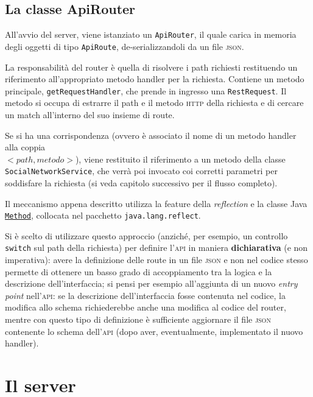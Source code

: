 \documentclass[a4paper,8pt]{article} %
\def\code#1{\texttt{#1}}
\begin{document}
\subsection{La classe ApiRouter}
All'avvio del server, viene istanziato un \code{ApiRouter}, il quale carica in memoria degli oggetti di tipo \code{ApiRoute}, de-serializzandoli da un file \textsc{json}.
\par La responsabilità del router è quella di risolvere i path richiesti restituendo un riferimento all'appropriato metodo handler per la richiesta.
Contiene un metodo principale, \code{getRequestHandler}, che prende in ingresso una \code{RestRequest}.
Il metodo si occupa di estrarre il path e il metodo \textsc{http} della richiesta e di cercare un match all'interno del suo insieme di route.
\par Se si ha una corrispondenza (ovvero è associato il nome di un metodo handler alla coppia\\ $<path, metodo>$),
viene restituito il riferimento a un metodo della classe \code{SocialNetworkService}, che verrà poi invocato coi corretti parametri per
soddisfare la richiesta (si veda capitolo successivo per il flusso completo).
\par Il meccanismo appena descritto utilizza la feature della \emph{reflection} e la classe Java \href{https://docs.oracle.com/javase/8/docs/api/java/lang/reflect/Method.html}{\code{Method}},
collocata nel pacchetto \code{java.lang.reflect}.
\par Si è scelto di utilizzare questo approccio (anziché, per esempio, un controllo \code{switch} sul path della richiesta) per definire l'\textsc{api} in maniera \textbf{dichiarativa} (e non imperativa):
avere la definizione delle route in un file \textsc{json} e non nel codice stesso permette di ottenere un basso grado di accoppiamento tra la logica e la descrizione dell'interfaccia; si pensi per
esempio all'aggiunta di un nuovo \emph{entry point} nell'\textsc{api}: se la descrizione dell'interfaccia fosse contenuta nel codice, la modifica allo schema richiederebbe anche una modifica al codice del router,
mentre con questo tipo di definizione è sufficiente aggiornare il file \textsc{json} contenente lo schema dell'\textsc{api} (dopo aver, eventualmente, implementato il nuovo handler).



\section{Il server}
\end{document}
